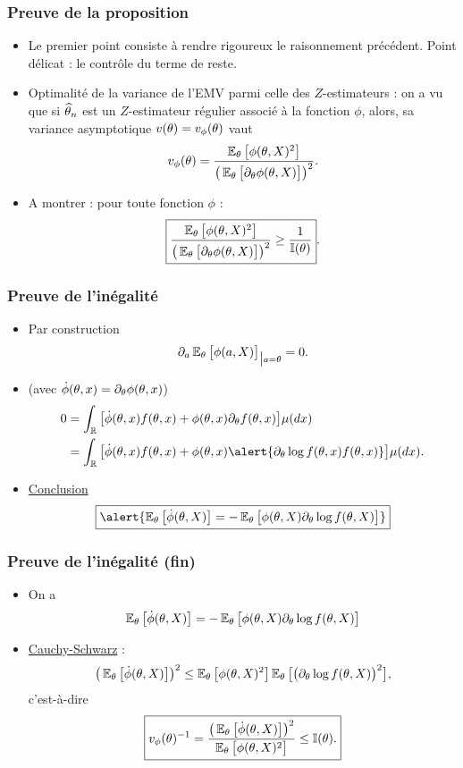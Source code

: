 \begin{frame}
\frametitle{Preuve de la proposition}
\begin{itemize}
\item Le premier point consiste à \alert{rendre rigoureux} le raisonnement précédent. \alert{Point délicat : } le contrôle du terme de reste.
\item \alert{Optimalité de la variance de l'EMV parmi celle des $Z$-estimateurs} : on a vu que si $\operatorname{\widehat \theta_{\mathnormal{n}}}$ est un $Z$-estimateur régulier associé à la fonction $\phi$, alors, sa variance asymptotique $v(\theta) = v_\phi(\theta)$ vaut
$$v_\phi(\theta) = \frac{\operatorname{{\mathbb E}}_\theta\big[\phi(\theta,X)^2\big]}{\big(\operatorname{{\mathbb E}}_\theta\big[\partial_\theta \phi(\theta, X)\big]\big)^2}.$$
\item \alert{A montrer} : pour toute fonction $\phi$ :
$$\boxed{\frac{\operatorname{{\mathbb E}}_\theta\big[\phi(\theta,X)^2\big]}{\big(\operatorname{{\mathbb E}}_\theta\big[\partial_\theta \phi(\theta, X)\big]\big)^2} \geq \frac{1}{\mathbb{I}(\theta)}}.$$
\end{itemize}
\end{frame}

\begin{frame}
\frametitle{Preuve de l'inégalité}
\begin{itemize}
\item Par construction
$$\partial_a\operatorname{{\mathbb E}}_\theta\big[\phi(a,X)\big]_{\big|a=\theta}=0.$$
\item (avec $\dot\phi(\theta, x)=\partial_{\theta}\phi(\theta,x)$)
\begin{align*}
0&=\int_{\R}\big[\dot \phi(\truetheta,x)f(\truetheta,x)+\phi(\truetheta,x)\partial_\truetheta f(\truetheta,x)\big]\mu(dx)\\
& = \int_{\R}\big[\dot \phi(\truetheta,x)f(\truetheta,x)+\phi(\truetheta, x)\alert{\partial_\truetheta \log f(\truetheta, x) f(\truetheta,x)}\big]\mu(dx).
\end{align*}
\item \underline{Conclusion}
$$\boxed{\alert{\E_\truetheta\big[\dot \phi(\truetheta,X)\big] = -\E_\truetheta\big[\phi(\truetheta, X)\partial_\truetheta \log f(\truetheta,X)\big]}}$$
\end{itemize}
\end{frame}

\begin{frame}
\frametitle{Preuve de l'inégalité (fin)}
\begin{itemize}
\item On a
$$\operatorname{{\mathbb E}}_\theta\big[\dot \phi(\theta,X)\big] = -\operatorname{{\mathbb E}}_\theta\big[\phi(\theta, X)\partial_\theta \log f(\theta,X)\big]$$
\item \underline{Cauchy-Schwarz} :
$$\big(\operatorname{{\mathbb E}}_\theta\big[\dot \phi(\theta,X)\big] \big)^2 \leq \operatorname{{\mathbb E}}_\theta\big[\phi(\theta, X)^2\big] \operatorname{{\mathbb E}}_\theta\big[\big(\partial_\theta \log f(\theta,X)\big)^2\big],$$
c'est-à-dire
$$\boxed{v_\phi(\theta)^{-1} = \frac{\big(\operatorname{{\mathbb E}}_\theta\big[\dot \phi(\theta,X)\big] \big)^2}{\operatorname{{\mathbb E}}_\theta\big[\phi(\theta, X)^2\big]} \leq \mathbb{I}(\theta).}$$
\end{itemize}
\end{frame}

